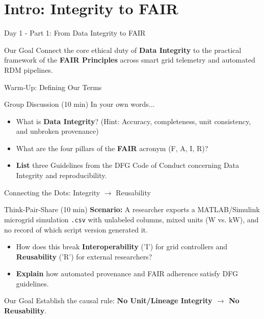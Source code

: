 \documentclass[aspectratio=169]{beamer}
\let\pause\relax
\begin{document}
\section{Intro: Integrity to FAIR}

\begin{frame}{Day 1 - Part 1: From Data Integrity to FAIR}
    \begin{block}{Our Goal}
        Connect the core ethical duty of \textbf{Data Integrity} to the practical framework of the \textbf{FAIR Principles} across smart grid telemetry and automated RDM pipelines.
    \end{block}
\end{frame}

\begin{frame}{Warm-Up: Defining Our Terms}
    \begin{block}{Group Discussion (10 min)}
        In your own words...
        \begin{itemize}
            \item What is \textbf{Data Integrity}? \pause (Hint: Accuracy, completeness, unit consistency, and unbroken provenance)
            \pause
            \item What are the four pillars of the \textbf{FAIR} acronym (F, A, I, R)?
            \pause
            \item \textbf{List} three Guidelines from the DFG Code of Conduct concerning Data Integrity and reproducibility.
        \end{itemize}
    \end{block}
\end{frame}

\begin{frame}{Connecting the Dots: Integrity $\rightarrow$ Reusability}
    \begin{block}{Think-Pair-Share (10 min)}
        \textbf{Scenario:} A researcher exports a MATLAB/Simulink microgrid simulation \texttt{.csv} with unlabeled columns, mixed units ($\text{W}$ vs. $\text{kW}$), and no record of which script version generated it.
        \pause
        \begin{itemize}
            \item How does this break \textbf{Interoperability} ('I') for grid controllers and \textbf{Reusability} ('R') for external researchers?
            \pause
            \item \textbf{Explain} how automated provenance and FAIR adherence satisfy DFG guidelines.
        \end{itemize}
    \end{block}
    \pause
    \begin{block}{Our Goal}
        Establish the causal rule: \textbf{No Unit/Lineage Integrity $\rightarrow$ No Reusability}.
    \end{block}
\end{frame}
\end{document}
